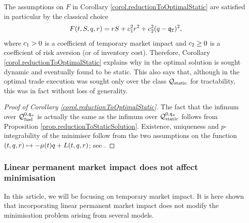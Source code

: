 \documentclass[10pt,a4paper]{article}
\begin{document}
	\begin{remark}\label{remark.reductionToStaticSolutionInCarteaTextbook}
		The assumptions on $F$ in Corollary \ref{corol.reductionToOptimalStatic} are satisfied in particular by the classical choice 
		\begin{equation}\label{eq.classicalLagrangianWithLinearTemporaryImpact}
		F(t,S, q,r)
		=rS + c_{1}^{2}  r^{2} + c_{2}^{2} ( q - \mathfrak{q}_{\mathtt{T} })^{2} ,
		\end{equation}
		where $c_{1}>0$ is a coefficient of temporary market impact and $c_{2}\geq 0 $ is a coefficient of risk aversion (or of inventory cost). Therefore, Corollary \ref{corol.reductionToOptimalStatic} explains why in \cite[Section 6.3]{CJP15alg} the optimal solution is sought dynamic and eventually found to be static. This also says that, although in \cite{AC00opt} the optimal trade execution was sought only over the class $\mathcal{Q}_{\text{static}}$ for tractability, this was in fact without loss of generality.
	\end{remark}
	
	\begin{proof}[Proof of Corollary \ref{corol.reductionToOptimalStatic}]
		The fact that the infimum over $\mathcal{Q}_{\text{fuel}}^{0,\mathfrak{q_0}}$ is actually the same as the infimum over $\mathcal{Q}_{\text{static}}^{0,\mathfrak{q_0}}$ follows from Proposition \ref{prop.reductionToStaticSolution}.  Existence, uniqueness and $p$-integrability of the minimiser follow from the two assumptions on the function $(t,q,r) \mapsto -\mu(t)q +L(t,q,r)$; see \cite[Theorem 4.1]{Dac08dir}.
	\end{proof}
		

	

	
	\subsubsection*{Linear permanent market impact does not affect minimisation}
	In this article, we will be focusing on temporary market impact. It is here shown that incorporating linear permanent market impact does not modify the minimisation problem arising from several models. 
	
\end{document}
